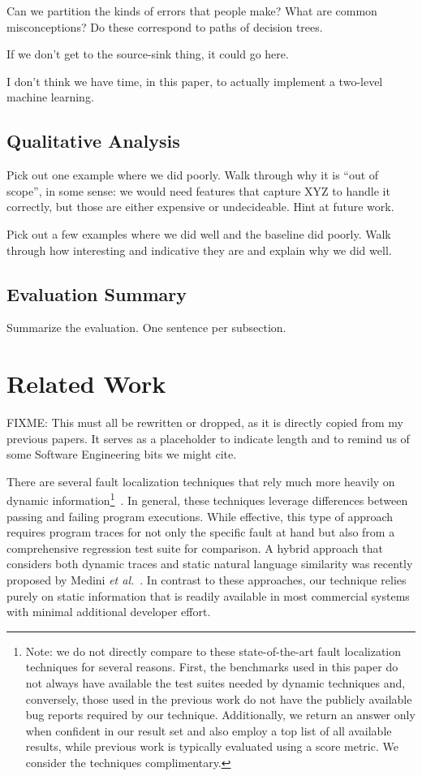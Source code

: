 \documentclass[conference]{IEEEtran}
\begin{document}
Can we partition the kinds of errors that people make? What are common
misconceptions? Do these correspond to paths of decision trees.

If we don't get to the source-sink thing, it could go here.

I don't think we have time, in this paper, to actually implement a
two-level machine learning.

\subsection{Qualitative Analysis}

Pick out one example where we did poorly. Walk through why it is ``out of
scope'', in some sense: we would need features that capture XYZ to handle
it correctly, but those are either expensive or undecideable. Hint at
future work.

Pick out a few examples where we did well and the baseline did poorly. Walk
through how interesting and indicative they are and explain why we did well.

\subsection{Evaluation Summary}

Summarize the evaluation. One sentence per subsection.

\section{Related Work}
FIXME: This must all be rewritten or dropped, as it is directly copied from
my previous papers. It serves as a placeholder to indicate length and to
remind us of some Software Engineering bits we might cite.

There are several fault localization techniques that rely much more heavily
on dynamic information\footnote{Note: we do not directly compare to these
state-of-the-art fault localization techniques for several reasons.  First,
the benchmarks used in this paper do not always have available the test
suites needed by dynamic techniques and, conversely, those used in the
previous work do not have the publicly available bug reports required
by our technique.  Additionally, we return an answer only when confident in
our result set and also employ a top list of all available results, while
previous work is typically evaluated using a score metric.  We consider the
techniques complimentary.}~\cite
{harrold05,Renieris03,cleve05,wang09}.
In general,
these techniques leverage differences between passing and failing program
executions.  While effective, this type of approach requires program traces
for not only the specific fault at hand but also from a comprehensive regression
test suite for comparison.
A hybrid approach that considers both dynamic
traces and static natural language similarity was recently proposed by
Medini \textit{et al.}~\cite{Medini11}.
In contrast to these approaches, our technique relies purely on static
information that is readily available in most commercial systems with minimal
additional developer effort.
\end{document}
